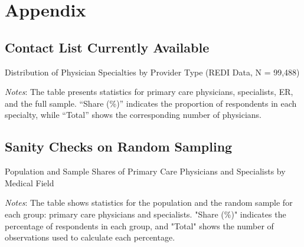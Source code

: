 \documentclass[11pt]{article}
\theoremstyle{definition}
\begin{document}
    \clearpage
\appendix

\section{Appendix}

\subsection{Contact List Currently Available}

\begin{table}[H]
    \centering
    \caption{Distribution of Physician Specialties by Provider Type (REDI Data, N = 99,488)}
    	\begin{adjustbox}{max width=0.8\textwidth}

\end{adjustbox}
     \parbox{.9\linewidth}{
        	\vspace{.2cm}
        		\scriptsize{\scriptsize{{\emph{Notes}: The table presents statistics for primary care physicians, specialists, ER, and the full sample. “Share (\%)” indicates the proportion of respondents in each specialty, while “Total” shows the corresponding number of physicians.}}}}
    \label{tab:spec_table}
\end{table}

\subsection{Sanity Checks on Random Sampling}\label{sanity}

\begin{table}[H]
    \centering
    \caption{Population and Sample Shares of Primary Care Physicians and Specialists by Medical Field}
              \begin{adjustbox}{width=0.85\linewidth}  

\end{adjustbox}
     \parbox{.9\linewidth}{
        	\vspace{.2cm}
        		\scriptsize{\scriptsize{{\emph{Notes}: The table shows statistics for the population and the random sample for each group: primary care physicians and specialists. "Share (\%)" indicates the percentage of respondents in each group, and "Total" shows the number of observations used to calculate each percentage.}}}}
    \label{tab:sanity_spec}
\end{table}
\end{document}
